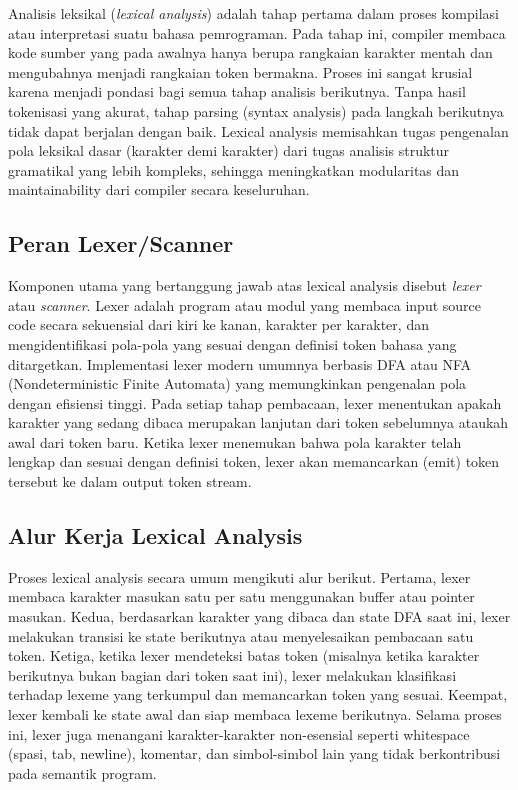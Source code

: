Analisis leksikal (\textit{lexical analysis}) adalah tahap pertama dalam proses kompilasi atau interpretasi suatu bahasa pemrograman. Pada tahap ini, compiler membaca kode sumber yang pada awalnya hanya berupa rangkaian karakter mentah dan mengubahnya menjadi rangkaian token bermakna. Proses ini sangat krusial karena menjadi pondasi bagi semua tahap analisis berikutnya. Tanpa hasil tokenisasi yang akurat, tahap parsing (syntax analysis) pada langkah berikutnya tidak dapat berjalan dengan baik. Lexical analysis memisahkan tugas pengenalan pola leksikal dasar (karakter demi karakter) dari tugas analisis struktur gramatikal yang lebih kompleks, sehingga meningkatkan modularitas dan maintainability dari compiler secara keseluruhan.

\subsection{Peran Lexer/Scanner}

Komponen utama yang bertanggung jawab atas lexical analysis disebut \textit{lexer} atau \textit{scanner}. Lexer adalah program atau modul yang membaca input source code secara sekuensial dari kiri ke kanan, karakter per karakter, dan mengidentifikasi pola-pola yang sesuai dengan definisi token bahasa yang ditargetkan. Implementasi lexer modern umumnya berbasis DFA atau NFA (Nondeterministic Finite Automata) yang memungkinkan pengenalan pola dengan efisiensi tinggi. Pada setiap tahap pembacaan, lexer menentukan apakah karakter yang sedang dibaca merupakan lanjutan dari token sebelumnya ataukah awal dari token baru. Ketika lexer menemukan bahwa pola karakter telah lengkap dan sesuai dengan definisi token, lexer akan memancarkan (emit) token tersebut ke dalam output token stream.

\subsection{Alur Kerja Lexical Analysis}

Proses lexical analysis secara umum mengikuti alur berikut. Pertama, lexer membaca karakter masukan satu per satu menggunakan buffer atau pointer masukan. Kedua, berdasarkan karakter yang dibaca dan state DFA saat ini, lexer melakukan transisi ke state berikutnya atau menyelesaikan pembacaan satu token. Ketiga, ketika lexer mendeteksi batas token (misalnya ketika karakter berikutnya bukan bagian dari token saat ini), lexer melakukan klasifikasi terhadap lexeme yang terkumpul dan memancarkan token yang sesuai. Keempat, lexer kembali ke state awal dan siap membaca lexeme berikutnya. Selama proses ini, lexer juga menangani karakter-karakter non-esensial seperti whitespace (spasi, tab, newline), komentar, dan simbol-simbol lain yang tidak berkontribusi pada semantik program.


